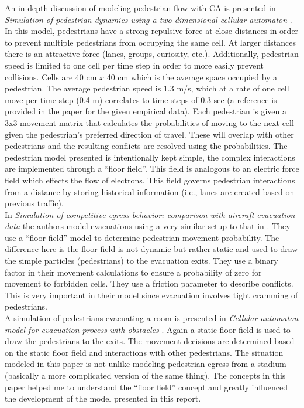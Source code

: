 \documentclass[paper=a4, fontsize=11pt]{scrartcl}
\numberwithin{equation}{section}		%
\numberwithin{figure}{section}			%
\numberwithin{table}{section}		    %
\begin{document}
\noindent
An in depth discussion of modeling pedestrian flow with CA is presented in \emph{Simulation of 
pedestrian dynamics using a two-dimensional cellular automaton} \cite{burstedde2001simulation}. 
In this model, pedestrians have a strong repulsive force at close distances in order to prevent 
multiple pedestrians from occupying the same cell. At larger distances there is an attractive 
force (lanes, groups, curiosity, etc.). Additionally, pedestrian speed is limited to one cell 
per time step in order to more easily prevent collisions. Cells are 40 cm $x$ 40 cm which 
is the average space occupied by a pedestrian. The average pedestrian speed is 1.3 m/s, which 
at a rate of one cell move per time step (0.4 m) correlates to time steps of 0.3 sec (a 
reference is provided in the paper for the given empirical data). Each pedestrian is given a 
3x3 movement matrix that calculates the probabilities of moving to the next cell given the 
pedestrian's preferred direction of travel. These will overlap with other pedestrians and the 
resulting conflicts are resolved using the probabilities. The pedestrian model presented is 
intentionally kept simple, the complex interactions are implemented through a ``floor field''. 
This field is analogous to an electric force field which effects the flow of electrons. This 
field governs pedestrian interactions from a distance by storing historical information (i.e., 
lanes are created based on previous traffic). \\

\noindent
In \emph{Simulation of competitive egress behavior: comparison with aircraft evacuation data} 
\cite{kirchner2003simulation} the authors model evacuations using a very similar setup 
to that in \cite{burstedde2001simulation}. They use a ``floor field'' model to 
determine pedestrian movement probability. The difference here is the floor field is not 
dynamic but rather static and used to draw the simple particles (pedestrians) to the evacuation 
exits. They	use a binary factor in their movement calculations to ensure a probability of zero 
for movement to forbidden cells. They use a friction parameter to describe conflicts. This is 
very important in their model since evacuation involves tight cramming of pedestrians.\\

\noindent
A simulation of pedestrians evacuating a room is presented in \emph{Cellular automaton model 
for evacuation process with obstacles} \cite{varas2007cellular}. Again a static floor field is 
used to draw the pedestrians to the exits. The movement decisions are determined based on the 
static floor field and interactions with other pedestrians. The situation modeled in this paper 
is not unlike modeling pedestrian egress from a stadium (basically a more complicated version 
of the same thing). The concepts in this paper helped me to understand the ``floor field'' 
concept and greatly influenced the development of the model presented in this report.\\
	
\end{document}

